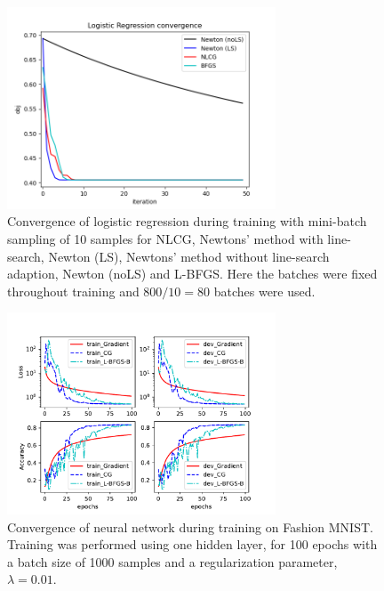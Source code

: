 \documentclass[11pt,twocolumn]{article}
\begin{document}
\begin{figure}[!ht]
\centering
\includegraphics[height=6cm, width=8cm]{../src-logistic/stoch_logreg_converge_test_batch_size_10.png}
\caption{Convergence of logistic regression during training with mini-batch sampling of 10 samples for NLCG, Newtons' method with line-search, Newton (LS),  Newtons' method without line-search adaption,  Newton (noLS) and L-BFGS. Here the batches were fixed throughout training and $800/10=80$ batches were used.}\label{StochFix_Logistic_regression_conv}
\end{figure}

\begin{figure}[!ht]
\centering
\includegraphics[height=6cm, width=8cm]{../src-mnist/compare_solvers_newtest_100_reg_0pt01_lr_0pt4.pdf}
\caption{Convergence of neural network during training on Fashion MNIST. Training was performed using one hidden layer, for 100 epochs with a batch size of 1000 samples and a regularization parameter, $\lambda=0.01$.}\label{NN_1layer}
\end{figure}
\end{document}
